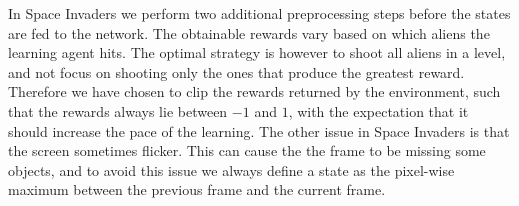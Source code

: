 \documentclass[11pt]{article}
\begin{document}
In Space Invaders we perform two additional preprocessing steps before
the states are fed to the network.
The obtainable rewards vary based on which aliens the learning agent
hits.
The optimal strategy is however to shoot all aliens in a level, and not focus on
shooting only the ones that produce the greatest reward.
Therefore we have chosen to clip the rewards returned by the environment, such that
the rewards always lie between $-1$ and $1$, with the expectation that it should increase
the pace of the learning.
The other issue in Space Invaders is that the screen sometimes flicker.
This can cause the the frame to be missing some objects, and
to avoid this issue we always define a state as the pixel-wise maximum
between the previous frame and the current frame.
\end{document}
